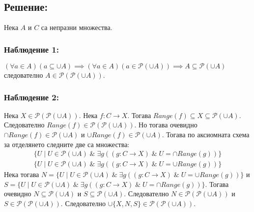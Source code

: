 \documentclass[12pt]{article}
\begin{document}
\subsection*{Решение:}
Нека \(A\) и \(C\) са непразни множества.

\subsubsection*{Наблюдение 1:}
\((\forall a \in A)(a \subseteq \cup A) \implies (\forall a \in A)(a \in \mathcal{P}(\cup A)) \implies A \subseteq \mathcal{P}(\cup A) \)
следователно \(A \in \mathcal{P}(\mathcal{P}(\cup A))\).

\subsubsection*{Наблюдение 2:}
Нека \(X \in \mathcal{P}(\mathcal{P}(\cup A))\).
Нека \(f : C \to X\). Тогава
\(Range(f) \subseteq X \subseteq \mathcal{P}(\cup A)\).
Следователно \(Range(f) \in \mathcal{P}(\mathcal{P}(\cup A))\).
Но тогава очевидно \\
\(\cap Range(f) \in \mathcal{P}(\cup A)\) и
\(\cup Range(f) \in \mathcal{P}(\cup A)\).
Тогава по аксиомната схема за отделянето следните две са множества:
\begin{align*}
\{U \; | \; U \in \mathcal{P}(\cup A) \; \& \; \exists g ((g : C \to X) \; \& \; U = \cap Range(g))\} \\
\{U \; | \; U \in \mathcal{P}(\cup A) \; \& \; \exists g ((g : C \to X) \; \& \; U = \cup Range(g))\}
\end{align*}
Нека тогава \(N = \{U \; | \; U \in \mathcal{P}(\cup A) \; \& \; \exists g ((g : C \to X) \; \& \; U = \cup Range(g))\}\) и
\(S = \{U \; | \; U \in \mathcal{P}(\cup A) \; \& \; \exists g ((g : C \to X) \; \& \; U = \cap Range(g))\}\).
Тогава очевидно \(N \subseteq \mathcal{P}(\cup A)\) и \(S \subseteq \mathcal{P}(\cup A)\).
Следователно \(N \in \mathcal{P}(\mathcal{P}(\cup A))\) и
\(S \in \mathcal{P}(\mathcal{P}(\cup A))\).
Следователно \(\cup\{X, N, S\} \in \mathcal{P}(\mathcal{P}(\cup A))\).
\end{document}
